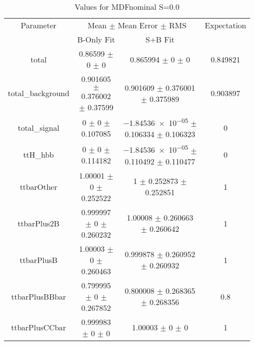 \begin{table}
\centering
\caption{Values for MDFnominal S=0.0}
\begin{tabular}{cccc}
\toprule
Parameter & \multicolumn{2}{c}{Mean $\pm$ Mean Error $\pm$ RMS} & Expectation\\
 & B-Only Fit & S+B Fit & \\
\midrule
total & \num{0.86599} $\pm$ \num{0} $\pm$ \num{0} & \num{0.865994} $\pm$ \num{0} $\pm$ \num{0} & \num{0.849821}\\
total\_background & \num{0.901605} $\pm$ \num{0.376002} $\pm$ \num{0.37599} & \num{0.901609} $\pm$ \num{0.376001} $\pm$ \num{0.375989} & \num{0.903897}\\
total\_signal & \num{0} $\pm$ \num{0} $\pm$ \num{0.107085} & \num{-1.84536e-05} $\pm$ \num{0.106334} $\pm$ \num{0.106323} & \num{0}\\
ttH\_hbb & \num{0} $\pm$ \num{0} $\pm$ \num{0.114182} & \num{-1.84536e-05} $\pm$ \num{0.110492} $\pm$ \num{0.110477} & \num{0}\\
ttbarOther & \num{1.00001} $\pm$ \num{0} $\pm$ \num{0.252522} & \num{1} $\pm$ \num{0.252873} $\pm$ \num{0.252851} & \num{1}\\
ttbarPlus2B & \num{0.999997} $\pm$ \num{0} $\pm$ \num{0.260232} & \num{1.00008} $\pm$ \num{0.260663} $\pm$ \num{0.260642} & \num{1}\\
ttbarPlusB & \num{1.00003} $\pm$ \num{0} $\pm$ \num{0.260463} & \num{0.999878} $\pm$ \num{0.260952} $\pm$ \num{0.260932} & \num{1}\\
ttbarPlusBBbar & \num{0.799995} $\pm$ \num{0} $\pm$ \num{0.267852} & \num{0.800008} $\pm$ \num{0.268365} $\pm$ \num{0.268356} & \num{0.8}\\
ttbarPlusCCbar & \num{0.999983} $\pm$ \num{0} $\pm$ \num{0} & \num{1.00003} $\pm$ \num{0} $\pm$ \num{0} & \num{1}\\
\bottomrule
\end{tabular}
\end{table}